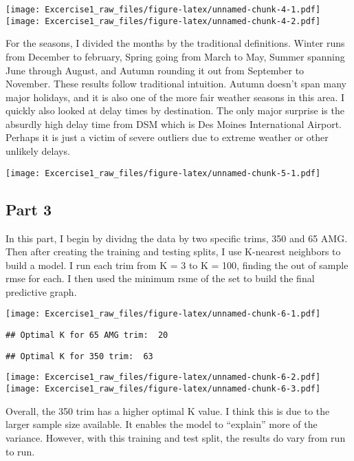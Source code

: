 \documentclass[]{article}
\begin{document}
\texttt{[image: Excercise1\_raw\_files/figure-latex/unnamed-chunk-4-1.pdf]}
\texttt{[image: Excercise1\_raw\_files/figure-latex/unnamed-chunk-4-2.pdf]}

For the seasons, I divided the months by the traditional definitions.
Winter runs from December to february, Spring going from March to May,
Summer spanning June through August, and Autumn rounding it out from
September to November. These results follow traditional intuition.
Autumn doesn't span many major holidays, and it is also one of the more
fair weather seasons in this area. I quickly also looked at delay times
by destination. The only major surprise is the absurdly high delay time
from DSM which is Des Moines International Airport. Perhaps it is just a
victim of severe outliers due to extreme weather or other unlikely
delays.

\texttt{[image: Excercise1\_raw\_files/figure-latex/unnamed-chunk-5-1.pdf]}

\subsection{Part 3}\label{part-3}

In this part, I begin by dividng the data by two specific trims, 350 and
65 AMG. Then after creating the training and testing splits, I use
K-nearest neighbors to build a model. I run each trim from K = 3 to K =
100, finding the out of sample rmse for each. I then used the minimum
rsme of the set to build the final predictive graph.

\texttt{[image: Excercise1\_raw\_files/figure-latex/unnamed-chunk-6-1.pdf]}

\begin{verbatim}
## Optimal K for 65 AMG trim:  20
\end{verbatim}

\begin{verbatim}
## Optimal K for 350 trim:  63
\end{verbatim}

\texttt{[image: Excercise1\_raw\_files/figure-latex/unnamed-chunk-6-2.pdf]}
\texttt{[image: Excercise1\_raw\_files/figure-latex/unnamed-chunk-6-3.pdf]}

Overall, the 350 trim has a higher optimal K value. I think this is due
to the larger sample size available. It enables the model to ``explain''
more of the variance. However, with this training and test split, the
results do vary from run to run.
\end{document}

